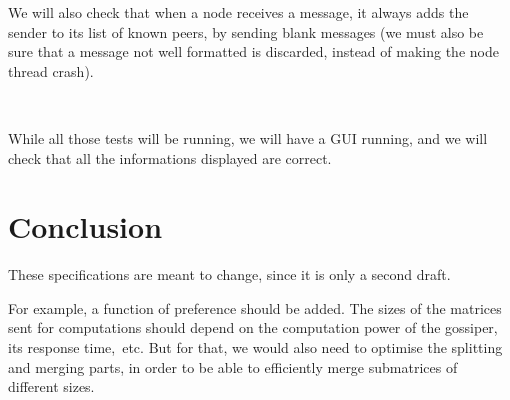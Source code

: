\documentclass[a4paper,12pt]{article}
\begin{document}
    We will also check that when a node receives a message, it always adds the sender to its list of known peers, by sending blank messages (we must also be sure that a message not well formatted is discarded, instead of making the node thread crash).
    
~~

    While all those tests will be running, we will have a GUI running, and we will check that all the informations displayed are correct.

    \section{Conclusion}
    These specifications are meant to change, since it is only a second draft.

    For example, a function of preference should be added. The sizes of the matrices sent for computations should depend on the computation power of the gossiper, its response time,~etc. But for that, we would also need to optimise the splitting and merging parts, in order to be able to efficiently merge submatrices of different sizes.
\end{document}
